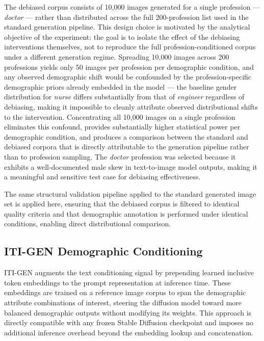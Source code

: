 The debiased corpus consists of 10{,}000 images generated for 
a single profession --- \textit{doctor} --- rather than 
distributed across the full 200-profession list used in the 
standard generation pipeline. This design choice is motivated 
by the analytical objective of the experiment: the goal is to 
isolate the effect of the debiasing interventions themselves, 
not to reproduce the full profession-conditioned corpus under 
a different generation regime. Spreading 10{,}000 images 
across 200 professions yields only 50 images per profession 
per demographic condition, and any observed demographic shift 
would be confounded by the profession-specific demographic 
priors already embedded in the model --- the baseline gender 
distribution for \textit{nurse} differs substantially from 
that of \textit{engineer} regardless of debiasing, making it 
impossible to cleanly attribute observed distributional shifts 
to the intervention. Concentrating all 10{,}000 images on a 
single profession eliminates this confound, provides 
substantially higher statistical power per demographic 
condition, and produces a comparison between the standard and 
debiased corpora that is directly attributable to the 
generation pipeline rather than to profession sampling. The 
\textit{doctor} profession was selected because it exhibits 
a well-documented male skew in text-to-image model outputs, 
making it a meaningful and sensitive test case for 
debiasing effectiveness.

The same structural validation pipeline applied to the 
standard generated image set is applied here, ensuring 
that the debiased corpus is filtered to identical quality 
criteria and that demographic annotation is performed under 
identical conditions, enabling direct distributional 
comparison.

\subsection{ITI-GEN Demographic Conditioning}
\label{subsec:itigen}

ITI-GEN \cite{Zhang_2023_ITIGEN} augments the text 
conditioning signal by prepending learned inclusive token 
embeddings to the prompt representation at inference time. 
These embeddings are trained on a reference image corpus to 
span the demographic attribute combinations of interest, 
steering the diffusion model toward more balanced demographic 
outputs without modifying its weights. This approach is 
directly compatible with any frozen Stable Diffusion 
checkpoint and imposes no additional inference overhead 
beyond the embedding lookup and concatenation.

